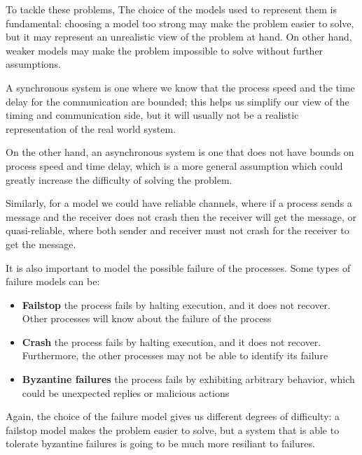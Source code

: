 To tackle these problems, The choice of the models used to represent them is fundamental: choosing a model too strong may make the problem easier to solve, but it may represent an unrealistic view of the problem at hand. On other hand, weaker models may make the problem impossible to solve without further assumptions. 

A synchronous system is one where we know that the process speed and the time delay for the communication are bounded; this helps us simplify our view of the timing and communication side, but it will usually not be a realistic representation of the real world system.

On the other hand, an asynchronous system is one that  does not have bounds on process speed and time delay, which is a more general assumption which could greatly increase the difficulty of solving the problem.

Similarly, for a model we could have reliable channels, where if a process sends a message and the receiver does not crash then the receiver will get the message, or quasi-reliable, where both sender and receiver must not crash for the receiver to get the message.

It is also important to model the possible failure of the processes. 
Some types of failure models can be:
\begin{itemize}
\item \textbf{Failstop} the process fails by halting execution, and it does not recover. Other processes will know about the failure of the process
\item \textbf{Crash} the process fails by halting execution, and it does not recover. Furthermore, the other processes may not be able to identify its failure
\item \textbf{Byzantine failures} the process fails by exhibiting arbitrary behavior, which could be unexpected replies or malicious actions
\end{itemize}

Again, the choice of the failure model gives us different degrees of difficulty: a failstop model makes the problem easier to solve, but a system that is able to tolerate byzantine failures is going to be much more resiliant to failures.

